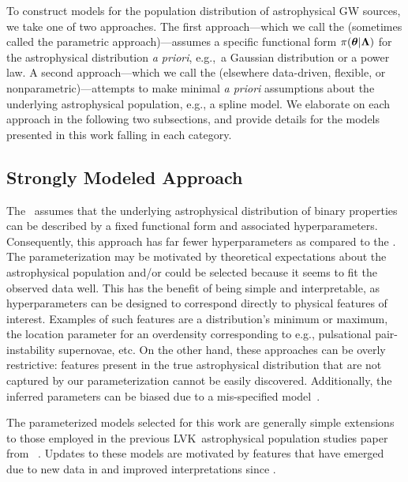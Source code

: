 

To construct models for the population distribution of astrophysical \ac{GW} sources, we take one of two approaches. 
The first approach---which we call the \textit{\parametric} (sometimes called the parametric approach)---assumes a specific functional form $\pi(\boldsymbol{\theta}|\boldsymbol{\Lambda})$ for the astrophysical distribution \textit{a priori}, e.g.,~a Gaussian distribution or a power law. 
A second approach---which we call the \textit{\nonparametric} (elsewhere data-driven, flexible, or nonparametric)---attempts to make  minimal  \textit{a priori} assumptions  about the underlying astrophysical population, e.g., a spline model. 
We elaborate on each approach in the following two subsections, and provide details for the models presented in this work falling in each category.

\subsection{Strongly Modeled Approach}

The \parametric~assumes that the underlying astrophysical distribution of binary properties can be described by a fixed functional form and associated hyperparameters. Consequently, this approach has far fewer hyperparameters as compared to the \nonparametric.
The parameterization may be motivated by theoretical expectations about the astrophysical population and/or could be selected because it seems to fit the observed data well.
This has the benefit of being simple and interpretable, as hyperparameters can be designed to correspond directly to physical features of interest.
Examples of such features are a distribution's minimum or maximum, the location parameter for an overdensity corresponding to e.g., pulsational pair-instability supernovae, etc.
On the other hand, these approaches can be overly restrictive: features present in the true astrophysical distribution that are not captured by our parameterization cannot be easily discovered. Additionally, the inferred parameters can be biased due to a mis-specified model~\citep[e.g.,][]{Romero-Shaw:2022ctb}.

The parameterized models selected for this work are generally simple extensions to those employed in the previous \ac{LVK}~astrophysical population studies paper from 
\gwtcthree~\citep{KAGRA:2021duu}. Updates to these models are motivated by features that have emerged due to new data in \gwtcfour and improved interpretations since \gwtcthree. 


